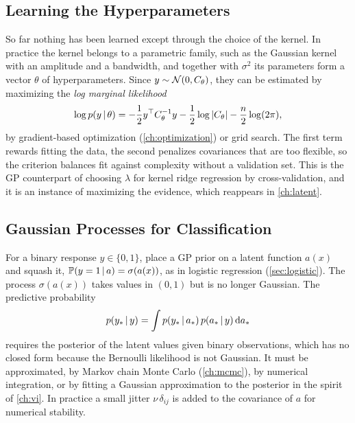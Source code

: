 \subsection{Learning the Hyperparameters}

So far nothing has been learned except through the choice of the kernel. In practice the kernel belongs to a parametric family, such as the Gaussian kernel with an amplitude and a bandwidth, and together with $\sigma^2$ its parameters form a vector $\theta$ of hyperparameters. Since $y\sim\mathcal{N}(0,C_\theta)$, they can be estimated by maximizing the \emph{log marginal likelihood}
\begin{equation}\label{eq:gp-marglik}
\log p(y\,|\,\theta)=-\frac12y^{\top} C_\theta^{-1}y-\frac12\log|C_\theta|-\frac n2\log(2\pi),
\end{equation}
by gradient-based optimization (\cref{ch:optimization}) or grid search. The first term rewards fitting the data, the second penalizes covariances that are too flexible, so the criterion balances fit against complexity without a validation set. This is the GP counterpart of choosing $\lambda$ for kernel ridge regression by cross-validation, and it is an instance of maximizing the evidence, which reappears in \cref{ch:latent}.

\subsection{Gaussian Processes for Classification}

For a binary response $y\in\{0,1\}$, place a GP prior on a latent function $a(x)$ and squash it, $\mathbb{P}(y=1\,|\, a)=\sigma(a(x))$, as in logistic regression (\cref{sec:logistic}). The process $\sigma(a(x))$ takes values in $(0,1)$ but is no longer Gaussian. The predictive probability
\[
p(y_*\,|\, y)=\int p(y_*\,|\, a_*)\,p(a_*\,|\, y)\,\mathrm{d} a_*
\]
requires the posterior of the latent values given binary observations, which has no closed form because the Bernoulli likelihood is not Gaussian. It must be approximated, by Markov chain Monte Carlo (\cref{ch:mcmc}), by numerical integration, or by fitting a Gaussian approximation to the posterior in the spirit of \cref{ch:vi}. In practice a small jitter $\nu\,\delta_{ij}$ is added to the covariance of $a$ for numerical stability.

